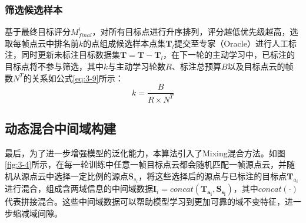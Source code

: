 \subsubsection{筛选候选样本}
基于最终目标评分\(M^i_{final}\)，对所有目标点进行升序排列，评分越低优先级越高，选取每帧点云中排名前\(k\)的点组成候选样本点集\(\mathbf{T}_l\)提交至专家（Oracle）进行人工标注，同时更新未标注目标数据集\(\mathbf{T}=\mathbf{T}-\mathbf{T}_l\)，在下一轮的主动学习中，已标注的目标点将不参与筛选，其中\(k\)与主动学习轮数\(R\)、标注总预算\(B\)以及目标点云的帧数$N^T$的关系如公式\eqref{eq:3-9}所示：
\begin{equation}
    \label{eq:3-9}
    k=\frac{B}{R \times N^T}
\end{equation}




\subsection{动态混合中间域构建}
最后，为了进一步增强模型的泛化能力，本算法引入了Mixing混合方法。如图\ref{fig:3-4}所示，在每一轮训练中任意一帧目标点云都会随机匹配一帧源点云，并随机从源点云中选择一定比例的源点\(\mathbf{S}_{s_i}\)，将这些选择后的源点与已标注的目标点\(\mathbf{T}_{a_i}\)进行混合，组成含两域信息的中间域数据\(\mathbf{I}_i=concat(\mathbf{T_{a_i}},\mathbf{S_{s_i}})\)，其中\(concat(\cdot)\)代表拼接混合。这些中间域数据可以帮助模型学习到更加可靠的域不变特征，进一步缩减域间隙。

